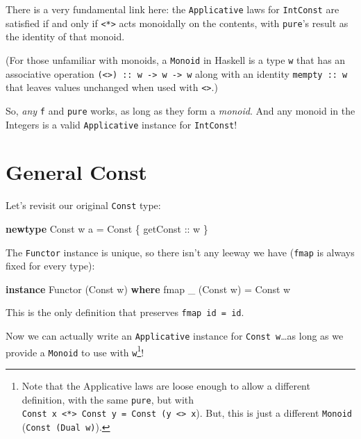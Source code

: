 \documentclass[]{article}
\newenvironment{Shaded}{}{}
\newcommand{\DataTypeTok}[1]{\textcolor[rgb]{0.56,0.13,0.00}{#1}}
\newcommand{\FunctionTok}[1]{\textcolor[rgb]{0.02,0.16,0.49}{#1}}
\newcommand{\KeywordTok}[1]{\textcolor[rgb]{0.00,0.44,0.13}{\textbf{#1}}}
\newcommand{\NormalTok}[1]{#1}
\newcommand{\OtherTok}[1]{\textcolor[rgb]{0.00,0.44,0.13}{#1}}
\begin{document}
There is a very fundamental link here: the \texttt{Applicative} laws for
\texttt{IntConst} are satisfied if and only if
\texttt{\textless{}*\textgreater{}} acts monoidally on the contents, with
\texttt{pure}'s result as the identity of that monoid.

(For those unfamiliar with monoids, a \texttt{Monoid} in Haskell is a type
\texttt{w} that has an associative operation
\texttt{(\textless{}\textgreater{})\ ::\ w\ -\textgreater{}\ w\ -\textgreater{}\ w}
along with an identity \texttt{mempty\ ::\ w} that leaves values unchanged when
used with \texttt{\textless{}\textgreater{}}.)

So, \emph{any} \texttt{f} and \texttt{pure} works, as long as they form a
\emph{monoid}. And any monoid in the Integers is a valid \texttt{Applicative}
instance for \texttt{IntConst}!

\section{General Const}\label{general-const}

Let's revisit our original \texttt{Const} type:

\begin{Shaded}
\begin{Highlighting}[]
\KeywordTok{newtype} \DataTypeTok{Const}\NormalTok{ w a }\OtherTok{=} \DataTypeTok{Const}\NormalTok{ \{}\OtherTok{ getConst ::}\NormalTok{ w \}}
\end{Highlighting}
\end{Shaded}

The \texttt{Functor} instance is unique, so there isn't any leeway we have
(\texttt{fmap} is always fixed for every type):

\begin{Shaded}
\begin{Highlighting}[]
\KeywordTok{instance} \DataTypeTok{Functor}\NormalTok{ (}\DataTypeTok{Const}\NormalTok{ w) }\KeywordTok{where}
    \FunctionTok{fmap}\NormalTok{ \_ (}\DataTypeTok{Const}\NormalTok{ w) }\OtherTok{=} \DataTypeTok{Const}\NormalTok{ w}
\end{Highlighting}
\end{Shaded}

This is the only definition that preserves \texttt{fmap\ id\ =\ id}.

Now we can actually write an \texttt{Applicative} instance for
\texttt{Const\ w}\ldots as long as we provide a \texttt{Monoid} to use with
\texttt{w}\footnote{Note that the Applicative laws are loose enough to allow a
  different definition, with the same \texttt{pure}, but with
  \texttt{Const\ x\ \textless{}*\textgreater{}\ Const\ y\ =\ Const\ (y\ \textless{}\textgreater{}\ x}).
  But, this is just a different \texttt{Monoid} (\texttt{Const\ (Dual\ w)}).}!
\end{document}
